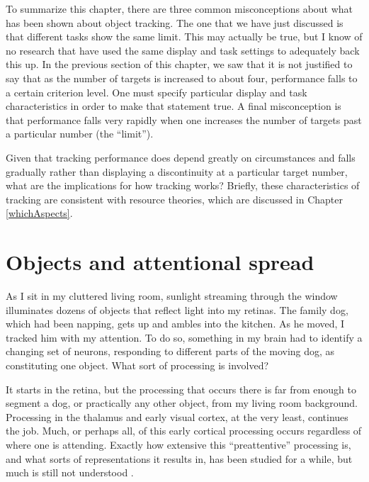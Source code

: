 \documentclass[
]{book}
\begin{document}
To summarize this chapter, there are three common misconceptions about what has been shown about object tracking. The one that we have just discussed is that different tasks show the same limit. This may actually be true, but I know of no research that have used the same display and task settings to adequately back this up. In the previous section of this chapter, we saw that it is not justified to say that as the number of targets is increased to about four, performance falls to a certain criterion level. One must specify particular display and task characteristics in order to make that statement true. A final misconception is that performance falls very rapidly when one increases the number of targets past a particular number (the ``limit'').

Given that tracking performance does depend greatly on circumstances and falls gradually rather than displaying a discontinuity at a particular target number, what are the implications for how tracking works? Briefly, these characteristics of tracking are consistent with resource theories, which are discussed in Chapter \ref{whichAspects}.

\hypertarget{objects}{%
\chapter{Objects and attentional spread}\label{objects}}

As I sit in my cluttered living room, sunlight streaming through the window illuminates dozens of objects that reflect light into my retinas. The family dog, which had been napping, gets up and ambles into the kitchen. As he moved, I tracked him with my attention. To do so, something in my brain had to identify a changing set of neurons, responding to different parts of the moving dog, as constituting one object. What sort of processing is involved?

It starts in the retina, but the processing that occurs there is far from enough to segment a dog, or practically any other object, from my living room background. Processing in the thalamus and early visual cortex, at the very least, continues the job. Much, or perhaps all, of this early cortical processing occurs regardless of where one is attending. Exactly how extensive this ``preattentive'' processing is, and what sorts of representations it results in, has been studied for a while, but much is still not understood \citep{neisserDecisionTimeReactionTimeExperiments1963, treismanVerbalCuesLanguage1964, kimchiFiguregroundSegmentationCan2008}.
\end{document}
